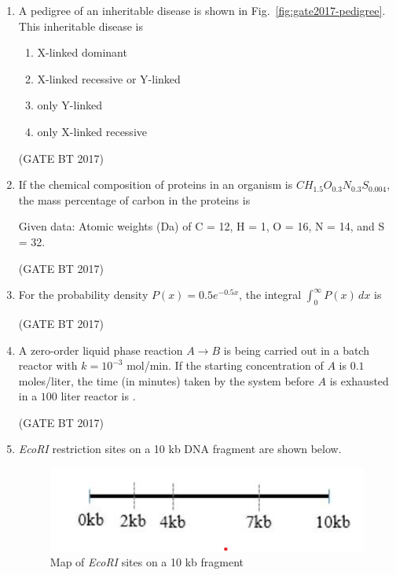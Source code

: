 \documentclass[journal,12pt,onecolumn]{IEEEtran}
\theoremstyle{remark}
\begin{document}
\begin{enumerate}
\item A pedigree of an inheritable disease is shown in Fig.~\ref{fig:gate2017-pedigree}. This inheritable disease is

\begin{enumerate}
\item X-linked dominant
\item X-linked recessive or Y-linked
\item only Y-linked
\item only X-linked recessive
\end{enumerate}

\hfill (GATE BT 2017)

\item If the chemical composition of proteins in an organism is $CH_{1.5}O_{0.3}N_{0.3}S_{0.004}$, the mass percentage of carbon in the proteins is 

Given data: Atomic weights (Da) of C = 12, H = 1, O = 16, N = 14, and S = 32.

\hfill (GATE BT 2017)

\item For the probability density $P(x)=0.5e^{-0.5x}$, the integral $\int_{0}^{\infty} P(x)\,dx$ is 

\hfill (GATE BT 2017)

\item A zero-order liquid phase reaction $A \rightarrow B$ is being carried out in a batch reactor with $k = 10^{-3}$ mol/min. If the starting concentration of $A$ is $0.1$ moles/liter, the time (in minutes) taken by the system before $A$ is exhausted in a $100$ liter reactor is \underline{\hspace{2cm}}.

\hfill (GATE BT 2017)

\item \textit{EcoRI} restriction sites on a 10 kb DNA fragment are shown below.
\begin{figure}
    \centering
    \includegraphics[width=\columnwidth]{figs/fragment .png}
    \caption{Map of \textit{EcoRI} sites on a 10 kb fragment}
    \label{fig:ecoRI-partial}
\end{figure}


\end{enumerate}
\end{document}
